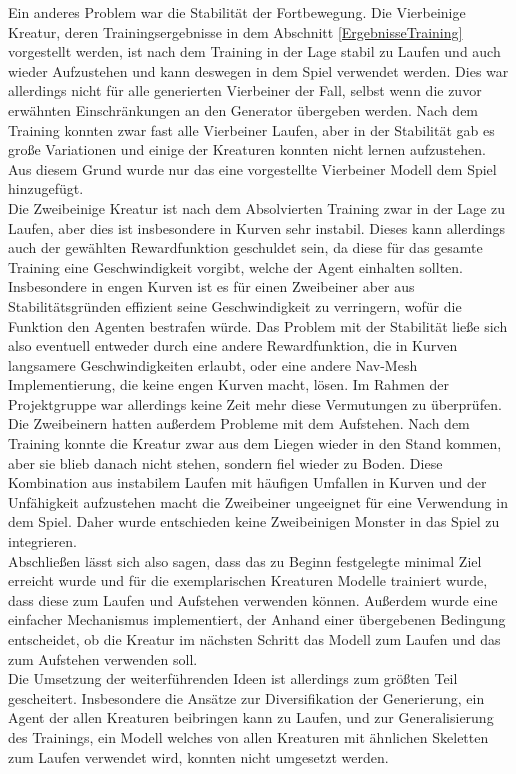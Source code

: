 Ein anderes Problem war die Stabilität der Fortbewegung. Die Vierbeinige Kreatur, deren Trainingsergebnisse in dem Abschnitt \ref{ErgebnisseTraining} vorgestellt werden, ist nach dem Training in der Lage stabil zu Laufen und auch wieder Aufzustehen und kann deswegen in dem Spiel verwendet werden. 
Dies war allerdings nicht für alle generierten Vierbeiner der Fall, selbst wenn die zuvor erwähnten Einschränkungen an den Generator übergeben werden. Nach dem Training konnten zwar fast alle Vierbeiner Laufen, aber in der Stabilität gab es große Variationen und einige der Kreaturen konnten nicht lernen aufzustehen. Aus diesem Grund wurde nur das eine vorgestellte Vierbeiner Modell dem Spiel hinzugefügt.\\
Die Zweibeinige Kreatur ist nach dem Absolvierten Training zwar in der Lage zu Laufen, aber dies ist insbesondere in Kurven sehr instabil. Dieses kann allerdings auch der gewählten Rewardfunktion geschuldet sein, da diese für das gesamte Training eine Geschwindigkeit vorgibt, welche der Agent einhalten sollten. Insbesondere in engen Kurven ist es für einen Zweibeiner aber aus Stabilitätsgründen effizient seine Geschwindigkeit zu verringern, wofür die Funktion den Agenten bestrafen würde. Das Problem mit der Stabilität ließe sich also eventuell entweder durch eine andere Rewardfunktion, die in Kurven langsamere Geschwindigkeiten erlaubt, oder eine andere Nav-Mesh Implementierung, die keine engen Kurven macht, lösen. Im Rahmen der Projektgruppe war allerdings keine Zeit mehr diese Vermutungen zu überprüfen.\\
Die Zweibeinern hatten außerdem Probleme mit dem Aufstehen. Nach dem Training konnte die Kreatur zwar aus dem Liegen wieder in den Stand kommen, aber sie blieb danach nicht stehen, sondern fiel wieder zu Boden. Diese Kombination aus instabilem Laufen mit häufigen Umfallen in Kurven und der Unfähigkeit aufzustehen macht die Zweibeiner ungeeignet für eine Verwendung in dem Spiel. Daher wurde entschieden keine Zweibeinigen Monster in das Spiel zu integrieren. \\

Abschließen lässt sich also sagen, dass das zu Beginn festgelegte minimal Ziel erreicht wurde und für die exemplarischen Kreaturen Modelle trainiert wurde, dass diese zum Laufen und Aufstehen verwenden können. Außerdem wurde eine einfacher Mechanismus implementiert, der Anhand einer übergebenen Bedingung entscheidet, ob die Kreatur im nächsten Schritt das Modell zum Laufen und das zum Aufstehen verwenden soll. \\
Die Umsetzung der weiterführenden Ideen ist allerdings zum größten Teil gescheitert. 
Insbesondere die Ansätze zur Diversifikation der Generierung, ein Agent der allen Kreaturen beibringen kann zu Laufen, und zur Generalisierung des Trainings, ein Modell welches von allen Kreaturen mit ähnlichen Skeletten zum Laufen verwendet wird, konnten nicht umgesetzt werden.
